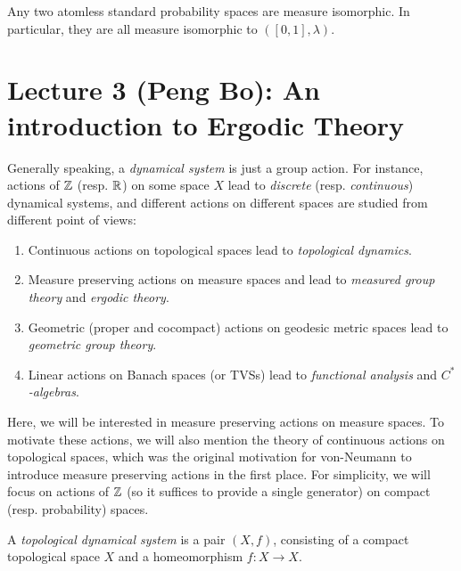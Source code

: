 \documentclass[reqno, twoside]{article}
\begin{document}
    \begin{theorem}\label{thm:measure_isomorphism_theorem}
        Any two atomless standard probability spaces are measure isomorphic. In particular, they are all measure isomorphic to $([0,1],\lambda)$.
    \end{theorem}

    \section{Lecture 3 (Peng Bo): An introduction to Ergodic Theory}\label{sec:3}

    Generally speaking, a \textit{dynamical system} is just a group action. For instance, actions of $\mathbb{Z}$ (resp. $\mathbb{R}$) on some space $X$ lead to \textit{discrete} (resp. \textit{continuous}) dynamical systems, and different actions on different spaces are studied from different point of views:
    \begin{enumerate}
        \item Continuous actions on topological spaces lead to \textit{topological dynamics}.
            \vspace{-0.05in}
        \item Measure preserving actions on measure spaces and lead to \textit{measured group theory} and \textit{ergodic theory}.
            \vspace{-0.05in}
        \item Geometric (proper and cocompact) actions on geodesic metric spaces lead to \textit{geometric group theory}.
            \vspace{-0.05in}
        \item Linear actions on Banach spaces (or TVSs) lead to \textit{functional analysis} and \textit{$C^\ast$-algebras}.
    \end{enumerate}

    Here, we will be interested in measure preserving actions on measure spaces. To motivate these actions, we will also mention the theory of continuous actions on topological spaces, which was the original motivation for von-Neumann to introduce measure preserving actions in the first place. For simplicity, we will focus on actions of $\mathbb{Z}$ (so it suffices to provide a single generator) on compact (resp. probability) spaces.

    \begin{definition}
        A \textit{topological dynamical system} is a pair $(X,f)$, consisting of a compact topological space $X$ and a homeomorphism $f:X\to X$.
    \end{definition}
\end{document}
